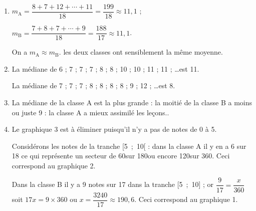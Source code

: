
\medskip  

%
%
%

\begin{enumerate}
\item %
$m_{\text{A}} = \dfrac{8 + 7 + 12 + \cdots + 11}{18} = \dfrac{199}{18} \approx 11,1$ ;

$m_{\text{B}} = \dfrac{7 + 8 + 7 + \cdots + 9}{18} = \dfrac{188}{17} \approx 11,1$.

On a $m_{\text{A}} \approx m_{\text{B}}$. les deux classes ont sensiblement la même moyenne. 
\item %
La médiane de 6 ; 7 ; 7 ; 7 ; 8 ; 8 ; 10 ; 10 ; 11 ; 11 ; \ldots est 11.

La médiane de 7 ; 7 ; 7 ; 8 ; 8 ; 8 ; 8 ; 9 ; 12 ; \ldots est 8.
\item %
La médiane de la classe A est la plus grande : la moitié de la classe B a moins ou juste 9 : la classe A a mieux assimilé les leçons..
\item %

Le graphique 3 est à éliminer puisqu'il n'y a pas de notes de 0 à 5.

Considérons les notes de la tranche [5~;~10[ : dans la classe A il y en a 6 sur 18 ce qui représente un secteur de 60\degres sur 180\degres ou encore 120\degres sur 360\degres. Ceci  correspond au graphique 2.

Dans la classe B il y a 9 notes sur 17 dans la tranche [5~;~10]  ; or $\dfrac{9}{17} = \dfrac{x}{360}$ soit $17x = 9 \times 360$ ou $x = \dfrac{3240}{17} \approx 190,6$\degres. Ceci correspond au graphique 1.
\end{enumerate}

